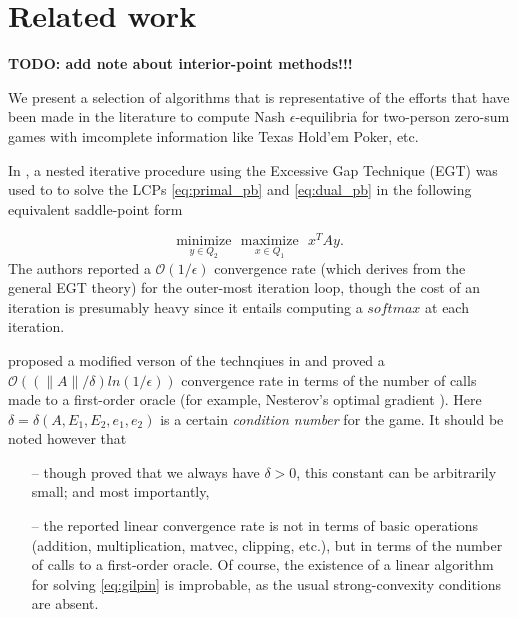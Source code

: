\documentclass[envcountsame]{llcns2e/llncs}
\begin{document}
\section{Related work}
\label{sec:related_work}
\textbf{TODO: add note about interior-point methods!!!}

We present a selection of algorithms that is representative of the
efforts that have been made in the literature to compute Nash
$\epsilon$-equilibria for two-person zero-sum games with imcomplete
information like Texas Hold'em Poker, etc.


In \cite{hoda2010smoothing}, a nested iterative procedure using the
Excessive Gap Technique (EGT) \cite{nesterov2005excessive} was used to
to solve the LCPs \eqref{eq:primal_pb} and \eqref{eq:dual_pb} in the
following equivalent saddle-point form


\begin{equation}
  \underset{y \in Q_2}{\text{minimize}}\text{ }\underset{x \in
    Q_1}{\text{maximize}}\text{ }x^TAy.
  \label{eq:gilpin}
\end{equation}
The authors reported a $\mathcal{O}(1/\epsilon)$ convergence rate
(which derives from the general EGT theory) for the outer-most
iteration loop, though the cost of an iteration is presumably heavy
since it entails computing a $softmax$ at each iteration.


\cite{gilpinfirst} proposed a modified verson of the technqiues in
\cite{hoda2010smoothing} and  proved a $\mathcal{O}\left(\left(\|A\| /
\delta\right) ln\left(1 / \epsilon\right)\right)$ convergence rate in
terms of the number of calls made to a first-order oracle (for
example, Nesterov's optimal gradient \cite{nesterov1983}). Here
$\delta = \delta(A, E_1, E_2, e_1, e_2)$ is a certain
\textit{condition number} for the game. It should be noted however that
\begin{itemize}
\item[--] though \cite{gilpinfirst} proved that we always have $\delta
  > 0$, this constant can be arbitrarily small; and most importantly,
\item[--] the reported linear convergence rate is not in terms of
  basic operations (addition, multiplication, matvec, clipping, etc.),
  but in terms of the number of calls to a first-order oracle. Of
  course, the existence of a linear algorithm for solving
  \eqref{eq:gilpin} is improbable, as the usual strong-convexity
  conditions are absent.

\end{itemize}
\end{document}
